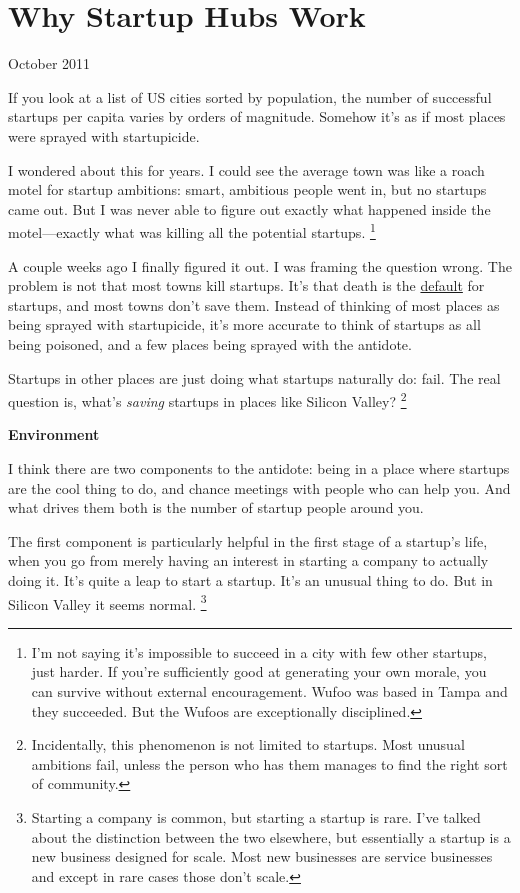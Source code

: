 \chapter{Why Startup Hubs Work}

October 2011

If you look at a list of US cities sorted by population, the number of
successful startups per capita varies by orders of magnitude. Somehow
it's as if most places were sprayed with startupicide.

I wondered about this for years. I could see the average town was like a
roach motel for startup ambitions: smart, ambitious people went in, but
no startups came out. But I was never able to figure out exactly what
happened inside the motel---exactly what was killing all the potential
startups. \footnote{I'm not saying it's impossible to succeed in a city with few
other startups, just harder. If you're sufficiently good at generating
your own morale, you can survive without external encouragement. Wufoo
was based in Tampa and they succeeded. But the Wufoos are exceptionally
disciplined.}

A couple weeks ago I finally figured it out. I was framing the question
wrong. The problem is not that most towns kill startups. It's that death
is the \href{die.html}{default} for startups, and most towns don't save
them. Instead of thinking of most places as being sprayed with
startupicide, it's more accurate to think of startups as all being
poisoned, and a few places being sprayed with the antidote.

Startups in other places are just doing what startups naturally do:
fail. The real question is, what's \emph{saving} startups in places like
Silicon Valley? \footnote{Incidentally, this phenomenon is not limited to startups. Most
unusual ambitions fail, unless the person who has them manages to find
the right sort of community.}

\textbf{Environment}

I think there are two components to the antidote: being in a place where
startups are the cool thing to do, and chance meetings with people who
can help you. And what drives them both is the number of startup people
around you.

The first component is particularly helpful in the first stage of a
startup's life, when you go from merely having an interest in starting a
company to actually doing it. It's quite a leap to start a startup. It's
an unusual thing to do. But in Silicon Valley it seems normal.
\footnote{Starting a company is common, but starting a startup is rare.
I've talked about the distinction between the two elsewhere, but
essentially a startup is a new business designed for scale. Most new
businesses are service businesses and except in rare cases those don't
scale.}

